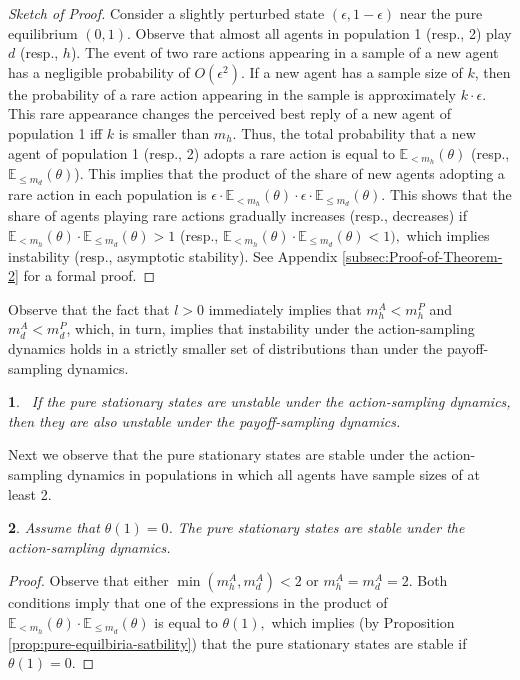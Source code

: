 \documentclass[12pt]{article}
\numberwithin{equation}{section}
\numberwithin{figure}{section}
\theoremstyle{definition}
\theoremstyle{plain}
\theoremstyle{plain}
\theoremstyle{plain}
\theoremstyle{remark}
\theoremstyle{plain}
\theoremstyle{plain}
\newtheorem{cor}{\protect\corollaryname}
\providecommand{\corollaryname}{Corollary}
\def\e{\epsilon}
\begin{document}
\begin{proof}[Sketch of Proof]
Consider a slightly perturbed state $(\epsilon,1-\epsilon)$ near the pure equilibrium $(0,1).$ Observe that almost all agents in population 1 (resp.,  2) play $d$ (resp., $h$). 
The event of two rare actions appearing in a sample of a new agent has a negligible probability of $O(\epsilon^2)$. If a new agent has a sample size of $k$, then the probability of a rare action appearing in the sample is approximately $k \cdot \epsilon.$ This rare appearance changes the perceived best reply of a new agent of population 1 iff $k$ is smaller than $m_{h}$. Thus, the total probability that a new agent of population 1 (resp., 2) adopts a rare action 
is equal to $\mathbb{E}_{<m_{h}}\left(\theta\right)$ (resp., $\mathbb{E}_{\leq m_{d}}\left(\theta\right)$). This implies that the product of the share of new agents adopting a rare action in each population is $\epsilon\cdot\mathbb{E}_{< m_{h}}\left(\theta\right)\cdot\e\cdot\mathbb{E}_{\leq m_{d}}\left(\theta\right)$. This shows that the share of agents playing rare actions gradually increases (resp., decreases) if $\mathbb{E}_{< m_{h}}\left(\theta\right)\cdot\mathbb{E}_{\leq m_{d}}\left(\theta\right)>1$ (resp., $\mathbb{E}_{< m_{h}}\left(\theta\right)\cdot\mathbb{E}_{\leq m_{d}}\left(\theta\right)<1),$ which implies instability (resp., asymptotic stability). See Appendix \ref{subsec:Proof-of-Theorem-2} for a formal proof.
\qedhere

\end{proof}
Observe that the fact that $l>0$ immediately implies that $m_{h}^{A}<m_{h}^{P}$ and $m_{d}^{A}<m_{d}^{P}$,
which, in turn, implies that instability under the action-sampling dynamics holds in a strictly smaller set of distributions than under the payoff-sampling dynamics. 
\begin{cor}
~\label{cor:Instability-A-instability-P}
If the pure stationary states are unstable under the action-sampling dynamics,
then they are also unstable under the payoff-sampling dynamics.

\end{cor}
Next we observe that the pure stationary states are stable under the action-sampling dynamics in populations in which all agents have sample sizes of at least 2.
\begin{cor}\label{cor:theta-1-action}
Assume that $\theta(1)=0$. The pure stationary states are stable under the action-sampling dynamics.
\end{cor}
\begin{proof}
Observe that either $\min(m_h^A,m_d^A)<2$ or $m_h^A=m_d^A=2$. Both conditions imply that one of the expressions in the product of $\mathbb{E}_{< m_{h}}\left(\theta\right)\cdot \mathbb{E}_{\leq m_{d}}\left(\theta\right)$ is equal to $\theta(1),$ which implies (by Proposition \ref{prop:pure-equilbiria-satbility}) that the pure stationary states are stable if $\theta(1)=0$. 
\end{proof}
\end{document}
